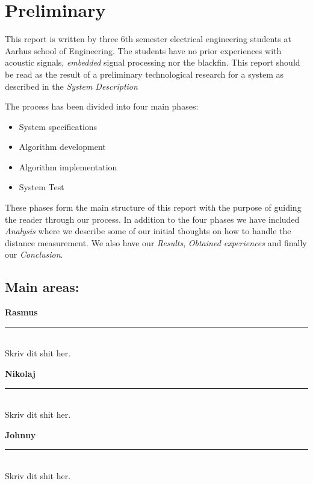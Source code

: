 \chapter{Preliminary}
This report is written by three 6th semester electrical engineering students at Aarhus school of Engineering. The students have no prior experiences with acoustic signals, \textit{embedded} signal processing nor the blackfin. This report should be read as the result of a preliminary technological research for a system as described in the \textit{System Description}

The process has been divided into four main phases:
\begin{itemize}
\item System specifications
\item Algorithm development
\item Algorithm implementation
\item System Test
\end{itemize}

These phases form the main structure of this report with the purpose of guiding the reader through our process. In addition to the four phases we have included \textit{Analysis} where we describe some of our initial thoughts on how to handle the distance measurement. We also have our \textit{Results}, \textit{Obtained experiences} and finally our \textit{Conclusion}.

\section{Main areas:}
\begin{minipage}{0.31\columnwidth}
\begin{center}
\textbf{Rasmus}
\end{center}
\hrule
\ \\
Skriv dit shit her.
\end{minipage}
\hfill
\vline
\hfill
\begin{minipage}{0.31\columnwidth}
\begin{center}
\textbf{Nikolaj}
\end{center}
\hrule
\ \\
Skriv dit shit her.
\end{minipage}
\hfill
\vline
\hfill
\begin{minipage}{0.31\columnwidth}
\begin{center}
\textbf{Johnny}
\end{center}
\hrule
\ \\
Skriv dit shit her.
\end{minipage}